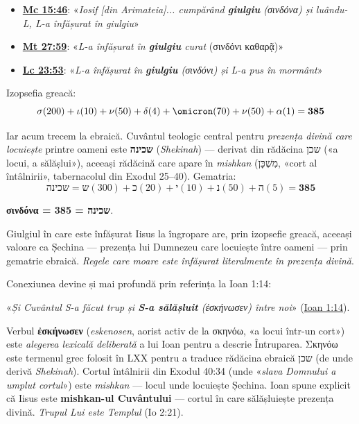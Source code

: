 \documentclass[12pt,a4paper,twoside,openany]{book}
\begin{document}
\begin{itemize}
  \item \textbf{\href{https://bibliaortodoxa.ro/carte.php?id=53\&cap=15\#46}{Mc 15:46}}: «\textit{Iosif [din Arimateia]... cumpărând \textbf{giulgiu} (σινδόνα) și luându-L, L-a înfășurat în giulgiu}»
  \item \textbf{\href{https://bibliaortodoxa.ro/carte.php?id=55\&cap=27\#59}{Mt 27:59}}: «\textit{L-a înfășurat în \textbf{giulgiu} curat} (σινδόνι καθαρᾷ)»
  \item \textbf{\href{https://bibliaortodoxa.ro/carte.php?id=50\&cap=23\#53}{Lc 23:53}}: «\textit{L-a înfășurat în \textbf{giulgiu} (σινδόνι) și L-a pus în mormânt}»
\end{itemize}

Izopsefia greacă:
\[
\sigma(200) + \iota(10) + \nu(50) + \delta(4) + \omicron(70) + \nu(50) + \alpha(1) = \mathbf{385}
\]

Iar acum trecem la ebraică. Cuvântul teologic central pentru \textit{prezența divină care locuiește} printre oameni este \textbf{שכינה} (\textit{Shekinah}) — derivat din rădăcina שכן («a locui, a sălășlui»), aceeași rădăcină care apare în \textit{mishkan} (מִשְׁכָּן, «cort al întâlnirii», tabernacolul din Exodul 25--40). Gematria:
\[
\text{שכינה} = \text{ש}(300) + \text{כ}(20) + \text{י}(10) + \text{נ}(50) + \text{ה}(5) = \mathbf{385}
\]

\textbf{σινδόνα = שכינה = 385}.

Giulgiul în care este înfășurat Iisus la îngropare are, prin izopsefie greacă, aceeași valoare ca Șechina — prezența lui Dumnezeu care locuiește între oameni — prin gematrie ebraică. \textit{Regele care moare este înfășurat literalmente în prezența divină}.

Conexiunea devine și mai profundă prin referința la Ioan 1:14:

\begin{biblequote}
«\textit{Și Cuvântul S-a făcut trup și \textbf{S-a sălășluit} (ἐσκήνωσεν) între noi}» (\href{https://bibliaortodoxa.ro/carte.php?id=35\&cap=1\#14}{Ioan 1:14}).
\end{biblequote}

Verbul \textbf{ἐσκήνωσεν} (\textit{eskenosen}, aorist activ de la σκηνόω, «a locui într-un cort») este \textit{alegerea lexicală deliberată} a lui Ioan pentru a descrie Întruparea. Σκηνόω este termenul grec folosit în LXX pentru a traduce rădăcina ebraică שכן (de unde derivă \textit{Shekinah}). Cortul întâlnirii din Exodul 40:34 (unde «\textit{slava Domnului a umplut cortul}») este \textit{mishkan} — locul unde locuiește Șechina. Ioan spune explicit că Iisus este \textbf{mishkan-ul Cuvântului} — cortul în care sălășluiește prezența divină. \textit{Trupul Lui este Templul} (Io 2:21).
\end{document}
